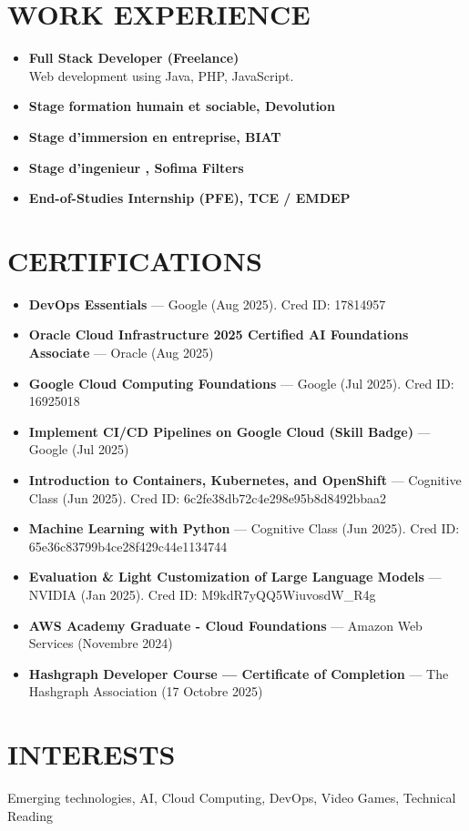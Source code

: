 \documentclass[paper=a4,fontsize=11pt]{scrartcl}
\newcommand{\sepspace}{\vspace*{0.5em}}
\newcommand{\NewPart}[1]{\section*{\uppercase{#1}}}
\begin{document}
\sepspace

\NewPart{Work Experience}
\begin{itemize}
    \item \textbf{Full Stack Developer (Freelance)} \\ %
    Web development using Java, PHP, JavaScript.

    \item \textbf{Stage formation humain et sociable, Devolution} %
    \item \textbf{Stage d'immersion en entreprise, BIAT} %
    \item \textbf{Stage d'ingenieur , Sofima Filters} %
    \item \textbf{End-of-Studies Internship (PFE), TCE / EMDEP} \\ %

\end{itemize}

\sepspace

\NewPart{Certifications}
\begin{itemize}
    \item \textbf{DevOps Essentials} — Google (Aug 2025). Cred ID: 17814957
    \item \textbf{Oracle Cloud Infrastructure 2025 Certified AI Foundations Associate} — Oracle (Aug 2025)
    \item \textbf{Google Cloud Computing Foundations} — Google (Jul 2025). Cred ID: 16925018
    \item \textbf{Implement CI/CD Pipelines on Google Cloud (Skill Badge)} — Google (Jul 2025)
    \item \textbf{Introduction to Containers, Kubernetes, and OpenShift} — Cognitive Class (Jun 2025). Cred ID: 6c2fe38db72c4e298e95b8d8492bbaa2
    \item \textbf{Machine Learning with Python} — Cognitive Class (Jun 2025). Cred ID: 65e36c83799b4ce28f429c44e1134744
    \item \textbf{Evaluation \& Light Customization of Large Language Models} — NVIDIA (Jan 2025). Cred ID: M9kdR7yQQ5WiuvosdW\_R4g
    \item \textbf{AWS Academy Graduate - Cloud Foundations} — Amazon Web Services (Novembre 2024)
    \item \textbf{Hashgraph Developer Course — Certificate of Completion} — The Hashgraph Association (17 Octobre 2025)
\end{itemize}

\sepspace

\NewPart{Interests}
\noindent
Emerging technologies, AI, Cloud Computing, DevOps, Video Games, Technical Reading
\end{document}
